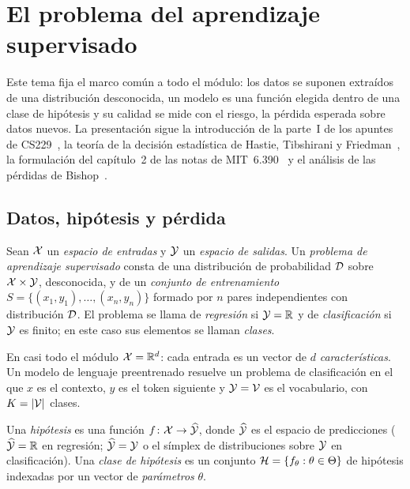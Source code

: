 \chapter{El problema del aprendizaje supervisado}
\label{tema:1}

Este tema fija el marco común a todo el módulo: los datos se suponen extraídos de una distribución desconocida, un modelo es una función elegida dentro de una clase de hipótesis y su calidad se mide con el riesgo, la pérdida esperada sobre datos nuevos. La presentación sigue la introducción de la parte~I de los apuntes de CS229~\cite{cs229}, la teoría de la decisión estadística de Hastie, Tibshirani y Friedman~\cite[§2.4]{esl}, la formulación del capítulo~2 de las notas de MIT~6.390~\cite{mit6390} y el análisis de las pérdidas de Bishop~\cite[§1.5.5]{bishop}.

\section{Datos, hipótesis y pérdida}

\begin{definicion}\label{def:supervisado}
Sean $\mathcal{X}$ un \emph{espacio de entradas} y $\mathcal{Y}$ un \emph{espacio de salidas}. Un \emph{problema de aprendizaje supervisado} consta de una distribución de probabilidad $\mathcal{D}$ sobre $\mathcal{X}\times\mathcal{Y}$, desconocida, y de un \emph{conjunto de entrenamiento} $S=\{(x_1,y_1),\dots,(x_n,y_n)\}$ formado por $n$ pares independientes con distribución $\mathcal{D}$. El problema se llama de \emph{regresión} si $\mathcal{Y}=\mathbb{R}$ y de \emph{clasificación} si $\mathcal{Y}$ es finito; en este caso sus elementos se llaman \emph{clases}.
\end{definicion}

En casi todo el módulo $\mathcal{X}=\mathbb{R}^{d}$: cada entrada es un vector de $d$ \emph{características}. Un modelo de lenguaje preentrenado resuelve un problema de clasificación en el que $x$ es el contexto, $y$ es el token siguiente y $\mathcal{Y}=\mathcal{V}$ es el vocabulario, con $K=\lvert\mathcal{V}\rvert$ clases.

\begin{definicion}
Una \emph{hipótesis} es una función $f\colon\mathcal{X}\to\widehat{\mathcal{Y}}$, donde $\widehat{\mathcal{Y}}$ es el espacio de predicciones ($\widehat{\mathcal{Y}}=\mathbb{R}$ en regresión; $\widehat{\mathcal{Y}}=\mathcal{Y}$ o el símplex de distribuciones sobre $\mathcal{Y}$ en clasificación). Una \emph{clase de hipótesis} es un conjunto $\mathcal{H}=\{f_\theta:\theta\in\Theta\}$ de hipótesis indexadas por un vector de \emph{parámetros} $\theta$.
\end{definicion}

